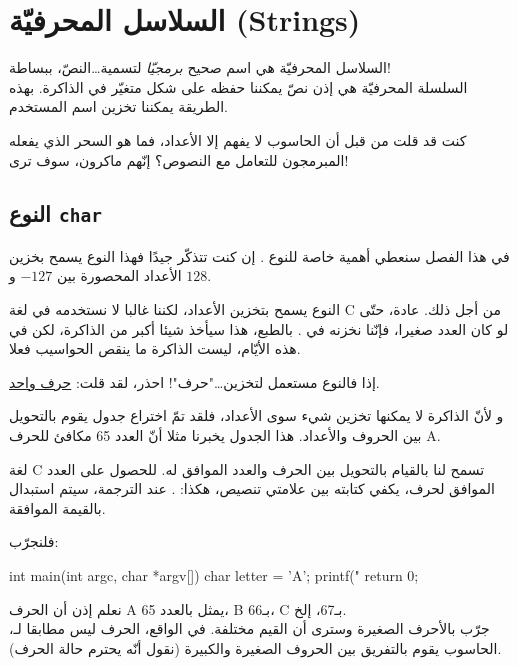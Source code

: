 \chapter{السلاسل المحرفيّة (\textenglish{Strings})}

السلاسل المحرفيّة هي اسم صحيح
\textit{برمجيّا}
لتسمية\dots النصّ، ببساطة!\\
السلسلة المحرفيّة هي إذن نصّ يمكننا حفظه على شكل متغيّر في الذاكرة. بهذه الطريقة يمكننا تخزين اسم المستخدم.

كنت قد قلت من قبل أن الحاسوب لا يفهم إلا الأعداد، فما هو السحر الذي يفعله المبرمجون للتعامل مع النصوص؟ إنّهم ماكرون، سوف ترى!

\section{النوع \texttt{char}}

في هذا الفصل سنعطي أهمية خاصة للنوع
.
إن كنت تتذكّر جيدًا فهذا النوع يسمح بخزين الأعداد المحصورة بين
$-127$
و
$128$.

\begin{information}
  النوع
 يسمح بتخزين الأعداد، لكننا غالبا لا نستخدمه في لغة \textenglish{C}
من أجل ذلك.
عادة، حتّى لو كان العدد صغيرا، فإنّنا نخزنه في
.
بالطبع، هذا سيأخذ  شيئا أكبر من الذاكرة، لكن في هذه الأيّام، ليست الذاكرة ما ينقص الحواسيب فعلا.
\end{information}

إذا فالنوع
مستعمل لتخزين\dots "حرف"! احذر، لقد قلت:
\underline{حرف واحد}.

و لأنّ الذاكرة لا يمكنها تخزين شيء سوى الأعداد، فلقد تمّ اختراع جدول يقوم بالتحويل بين الحروف والأعداد. هذا الجدول يخبرنا مثلا أنّ العدد 65 مكافئ للحرف
\textenglish{A}.

لغة
\textenglish{C}
تسمح لنا بالقيام بالتحويل بين الحرف والعدد الموافق له. للحصول على العدد الموافق لحرف، يكفي كتابته بين علامتي تنصيص، هكذا:
.
عند الترجمة، سيتم استبدال
بالقيمة الموافقة.

فلنجرّب:

\begin{Csource}
int main(int argc, char *argv[])
{
	char letter = 'A';
	printf("%
	return 0;
}
\end{Csource}

نعلم إذن أن الحرف
\textenglish{A}
يمثل بالعدد 65،
\textenglish{B}
بـ66،
\textenglish{C}
بـ67، إلخ.\\
جرّب بالأحرف الصغيرة وسترى أن القيم مختلفة. في الواقع، الحرف
ليس مطابقا لـ،
الحاسوب يقوم بالتفريق بين الحروف الصغيرة والكبيرة (نقول أنّه يحترم حالة الحرف).

